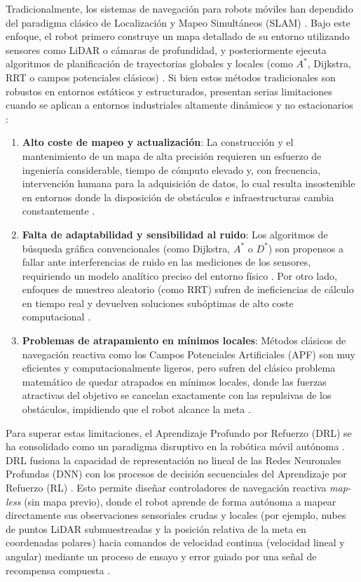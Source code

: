 Tradicionalmente, los sistemas de navegación para robots móviles han dependido del paradigma clásico de Localización y Mapeo Simultáneos (SLAM) \cite{Xue2022}. Bajo este enfoque, el robot primero construye un mapa detallado de su entorno utilizando sensores como LiDAR o cámaras de profundidad, y posteriormente ejecuta algoritmos de planificación de trayectorias globales y locales (como $A^*$, Dijkstra, RRT o campos potenciales clásicos) \cite{Sivashangaran2023, Xue2022}. Si bien estos métodos tradicionales son robustos en entornos estáticos y estructurados, presentan serias limitaciones cuando se aplican a entornos industriales altamente dinámicos y no estacionarios \cite{Xue2022}:
\begin{enumerate}
    \item \textbf{Alto coste de mapeo y actualización}: La construcción y el mantenimiento de un mapa de alta precisión requieren un esfuerzo de ingeniería considerable, tiempo de cómputo elevado y, con frecuencia, intervención humana para la adquisición de datos, lo cual resulta insostenible en entornos donde la disposición de obstáculos e infraestructuras cambia constantemente \cite{Xue2022}.
    \item \textbf{Falta de adaptabilidad y sensibilidad al ruido}: Los algoritmos de búsqueda gráfica convencionales (como Dijkstra, $A^*$ o $D^*$) son propensos a fallar ante interferencias de ruido en las mediciones de los sensores, requiriendo un modelo analítico preciso del entorno físico \cite{Sivashangaran2023}. Por otro lado, enfoques de muestreo aleatorio (como RRT) sufren de ineficiencias de cálculo en tiempo real y devuelven soluciones subóptimas de alto coste computacional \cite{Sivashangaran2023}.
    \item \textbf{Problemas de atrapamiento en mínimos locales}: Métodos clásicos de navegación reactiva como los Campos Potenciales Artificiales (APF) son muy eficientes y computacionalmente ligeros, pero sufren del clásico problema matemático de quedar atrapados en mínimos locales, donde las fuerzas atractivas del objetivo se cancelan exactamente con las repulsivas de los obstáculos, impidiendo que el robot alcance la meta \cite{Sivashangaran2023, Perez2018}.
\end{enumerate}

Para superar estas limitaciones, el Aprendizaje Profundo por Refuerzo (DRL) se ha consolidado como un paradigma disruptivo en la robótica móvil autónoma \cite{Sivashangaran2023, Xue2022}. DRL fusiona la capacidad de representación no lineal de las Redes Neuronales Profundas (DNN) con los procesos de decisión secuenciales del Aprendizaje por Refuerzo (RL) \cite{Sivashangaran2023, Xue2022, Shakya2023}. Esto permite diseñar controladores de navegación reactiva \textit{map-less} (sin mapa previo), donde el robot aprende de forma autónoma a mapear directamente sus observaciones sensoriales crudas y locales (por ejemplo, nubes de puntos LiDAR submuestreadas y la posición relativa de la meta en coordenadas polares) hacia comandos de velocidad continua (velocidad lineal y angular) mediante un proceso de ensayo y error guiado por una señal de recompensa compuesta \cite{Sivashangaran2023, Xue2022, Guo2025}.

